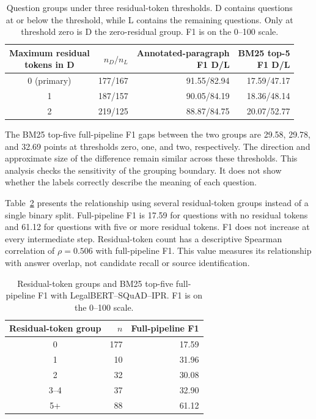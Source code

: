 \documentclass[pdflatex,sn-basic]{sn-jnl}%
\theoremstyle{thmstyleone}%
\theoremstyle{thmstyletwo}%
\theoremstyle{thmstylethree}%
\newcommand{\fixedreader}{LegalBERT--SQuAD--IPR}
\begin{document}
\begin{table}[!htbp]
    \caption{Question groups under three residual-token thresholds. D contains
    questions at or below the threshold, while L contains the remaining
    questions. Only at threshold zero is D the zero-residual group. F1 is on
    the 0--100 scale.}
    \label{tab:classifier_thresholds}
    \centering
    \small
    \setlength{\tabcolsep}{5pt}
    \begin{tabular}{@{}crrr@{}}
        \toprule
        \shortstack{Maximum residual\\tokens in D}
        & $n_D/n_L$
        & \shortstack{Annotated-paragraph\\F1 D/L}
        & \shortstack{BM25 top-5\\F1 D/L} \\
        \midrule
        0 (primary) & 177/167 & 91.55/82.94 & 17.59/47.17 \\
        1           & 187/157 & 90.05/84.19 & 18.36/48.14 \\
        2           & 219/125 & 88.87/84.75 & 20.07/52.77 \\
        \bottomrule
    \end{tabular}
\end{table}

The BM25 top-five full-pipeline F1 gaps between the two groups are 29.58,
29.78, and 32.69 points at thresholds zero, one, and two, respectively. The
direction and approximate size of the difference remain similar across these
thresholds. This analysis checks the sensitivity of the grouping boundary. It
does not show whether the labels correctly describe the meaning of each
question.

Table~\ref{tab:classifier_continuous} presents the relationship using several
residual-token groups instead of a single binary split. Full-pipeline F1 is
17.59 for questions with no residual tokens and 61.12 for questions with five
or more residual tokens. F1 does not increase at every intermediate step.
Residual-token count has a descriptive Spearman correlation of $\rho=0.506$
with full-pipeline F1. This value measures its relationship with answer
overlap, not candidate recall or source identification.

\begin{table}[!htbp]
    \caption{Residual-token groups and BM25 top-five full-pipeline F1 with
    \fixedreader{}. F1 is on the 0--100 scale.}
    \label{tab:classifier_continuous}
    \centering
    \small
    \begin{tabular}{@{}crr@{}}
        \toprule
        Residual-token group & $n$ & Full-pipeline F1 \\
        \midrule
        0    & 177 & 17.59 \\
        1    & 10  & 31.96 \\
        2    & 32  & 30.08 \\
        3--4 & 37  & 32.90 \\
        5+   & 88  & 61.12 \\
        \bottomrule
    \end{tabular}
\end{table}
\end{document}
